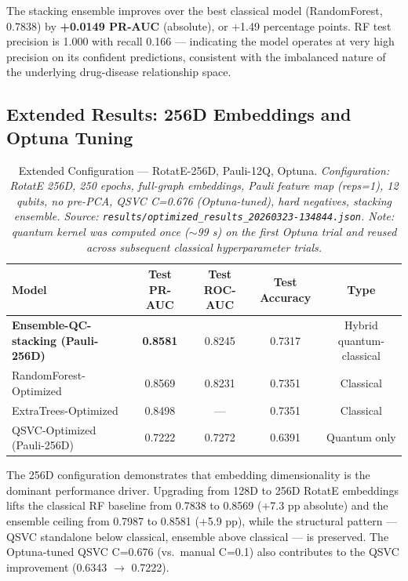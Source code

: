 \documentclass[twocolumn,10pt]{article}
\begin{document}
The stacking ensemble improves over the best classical model (RandomForest, 0.7838) by \textbf{+0.0149 PR-AUC} (absolute), or +1.49 percentage points. RF test precision is 1.000 with recall 0.166 --- indicating the model operates at very high precision on its confident predictions, consistent with the imbalanced nature of the underlying drug-disease relationship space.

\FloatBarrier
\subsection{Extended Results: 256D Embeddings and Optuna Tuning}

\begin{table}[t]
\centering
\caption{Extended Configuration --- RotatE-256D, Pauli-12Q, Optuna. \textit{Configuration: RotatE 256D, 250 epochs, full-graph embeddings, Pauli feature map (reps=1), 12 qubits, no pre-PCA, QSVC C=0.676 (Optuna-tuned), hard negatives, stacking ensemble. Source: \texttt{results/optimized\_results\_20260323-134844.json}. Note: quantum kernel was computed once (${\sim}$99 s) on the first Optuna trial and reused across subsequent classical hyperparameter trials.}}
\label{tab:extended}
\begin{tabular}{@{}lcccc@{}}
\toprule
\textbf{Model} & \textbf{Test PR-AUC} & \textbf{Test ROC-AUC} & \textbf{Test Accuracy} & \textbf{Type} \\
\midrule
\textbf{Ensemble-QC-stacking (Pauli-256D)} & \textbf{0.8581} & 0.8245 & 0.7317 & Hybrid quantum-classical \\
RandomForest-Optimized & 0.8569 & 0.8231 & 0.7351 & Classical \\
ExtraTrees-Optimized & 0.8498 & --- & 0.7351 & Classical \\
QSVC-Optimized (Pauli-256D) & 0.7222 & 0.7272 & 0.6391 & Quantum only \\
\bottomrule
\end{tabular}
\end{table}

The 256D configuration demonstrates that embedding dimensionality is the dominant performance driver. Upgrading from 128D to 256D RotatE embeddings lifts the classical RF baseline from 0.7838 to 0.8569 (+7.3 pp absolute) and the ensemble ceiling from 0.7987 to 0.8581 (+5.9 pp), while the structural pattern --- QSVC standalone below classical, ensemble above classical --- is preserved. The Optuna-tuned QSVC C=0.676 (vs.\ manual C=0.1) also contributes to the QSVC improvement (0.6343 $\to$ 0.7222).
\end{document}
